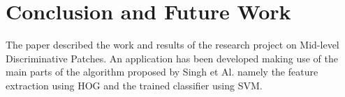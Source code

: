 \section{Conclusion and Future Work}

The paper described the work and results of the research project on Mid-level Discriminative Patches. An application has been developed making use of the main parts of the algorithm proposed by Singh et Al. \cite{Singh2012DiscPat} namely the feature extraction using HOG and the trained classifier using SVM.
